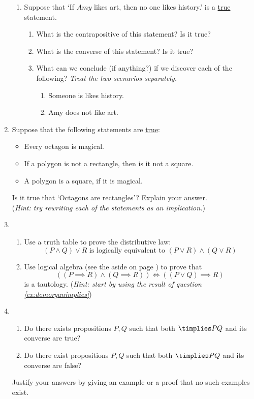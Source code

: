 \begin{enumerate}
\begin{enumerate}
  \item Suppose that `If $Amy$ likes art, then no one likes history.’ is a \underline{true} statement.
\begin{enumerate}
\item What is the contrapositive of this statement? Is it true?
\item  What is the converse of this statement? Is it true?
\item  What can we conclude (if anything?) if we discover each of the following? \emph{Treat the two scenarios separately.}
\begin{enumerate} \item Someone is likes history.
\item  Amy does not like art. \end{enumerate}
\end{enumerate}
\end{enumerate}

		
	\item Suppose that the following statements are \underline{true}:
  \begin{itemize}
    \item Every octagon is magical. 
    \item If a polygon is not a rectangle, then is it not a square. 
    \item A polygon is a square, if it is magical.
  \end{itemize}
  Is it true that `Octagons are rectangles'? Explain your answer.\\
  (\emph{Hint: try rewriting each of the statements as an implication.})
  
	\item\begin{enumerate}
	  \item Use a truth table to prove the distributive law:
		\[(P\wedge Q)\vee R \text{ is logically equivalent to } (P\vee R)\wedge(Q\vee R)\]
		\item Use logical algebra (see the aside on page \hyperlink{aside:logicalalglnk}{\pageref*{aside:logicalalg}}) to prove that
		\[\left((P\implies R)\wedge(Q\implies R)\right)\iff \left((P\vee Q)\implies R\right)\]
		is a tautology.
		(\emph{Hint: start by using the result of question \ref{ex:demorganimplies}})
	\end{enumerate}
	
  \item\begin{enumerate}
    	\item Do there exists propositions $P,Q$ such that both $\timplies PQ$ and its converse are true?
    	\item Do there exist propositions $P,Q$ such that both $\timplies PQ$ and its converse are false?
    \end{enumerate}
    Justify your answers by giving an example or a proof that no such examples exist.
    

\end{enumerate}
